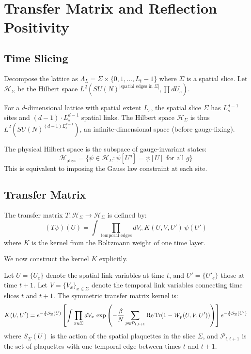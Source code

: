 \section{Transfer Matrix and Reflection Positivity}
\label{sec:transfer}

\subsection{Time Slicing}

Decompose the lattice as $\Lambda_L = \Sigma \times \{0, 1, \ldots, L_t-1\}$ 
where $\Sigma$ is a spatial slice. Let $\mathcal{H}_\Sigma$ be the Hilbert 
space $L^2(SU(N)^{|\text{spatial edges in }\Sigma|}, \prod dU_e)$.

\begin{remark}
For a $d$-dimensional lattice with spatial extent $L_s$, the spatial slice 
$\Sigma$ has $L_s^{d-1}$ sites and $(d-1) \cdot L_s^{d-1}$ spatial links. The 
Hilbert space $\mathcal{H}_\Sigma$ is thus $L^2(SU(N)^{(d-1)L_s^{d-1}})$, an 
infinite-dimensional space (before gauge-fixing).
\end{remark}

\begin{definition}
The physical Hilbert space is the subspace of gauge-invariant states:
\[
\mathcal{H}_{\text{phys}} = \{\psi \in \mathcal{H}_\Sigma : \psi[U^g] = \psi[U] \text{ for all } g\}
\]
This is equivalent to imposing the Gauss law constraint at each site.
\end{definition}

\subsection{Transfer Matrix}
\label{subsec:transfer}

\begin{definition}
The transfer matrix $T : \mathcal{H}_\Sigma \to \mathcal{H}_\Sigma$ is defined by:
\[
(T\psi)(U) = \int \prod_{\text{temporal edges}} dV_e \, 
K(U, V, U') \, \psi(U')
\]
where $K$ is the kernel from the Boltzmann weight of one time layer.
\end{definition}

We now construct the kernel $K$ explicitly.

\begin{lemma}
\label{lem:explicit-kernel}
Let $U = \{U_{e}\}$ denote the spatial link variables at time $t$, and 
$U' = \{U'_{e}\}$ those at time $t+1$. Let $V = \{V_x\}_{x \in \Sigma}$ 
denote the temporal link variables connecting time slices $t$ and $t+1$.
The symmetric transfer matrix kernel is:
\[
K(U, U') = e^{-\frac{1}{2}S_{\Sigma}(U)} \left[ \int \prod_{x \in \Sigma} dV_x \, \exp\left(-\frac{\beta}{N} 
\sum_{p \in \mathcal{P}_{t,t+1}} \operatorname{Re}\operatorname{Tr}(1 - W_p(U, V, U'))\right) \right] e^{-\frac{1}{2}S_{\Sigma}(U')}
\]
where $S_{\Sigma}(U)$ is the action of the spatial plaquettes in the slice $\Sigma$, and $\mathcal{P}_{t,t+1}$ is the set of plaquettes with one temporal edge 
between times $t$ and $t+1$.
\end{lemma}

